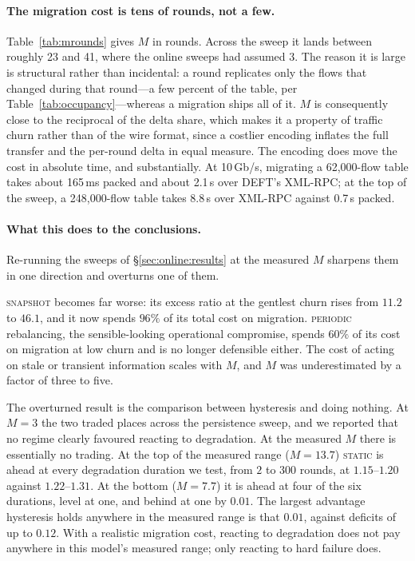 \paragraph{The migration cost is tens of rounds, not a few.}
Table~\ref{tab:mrounds} gives $M$ in rounds. Across the sweep it lands between
roughly 23 and 41, where the online sweeps had assumed $3$. The reason it is
large is structural rather than incidental: a round replicates only the flows that
changed during that round---a few percent of the table, per
Table~\ref{tab:occupancy}---whereas a migration ships all of it. $M$ is
consequently close to the reciprocal of the delta share, which makes it a
property of traffic churn rather than of the wire format, since a costlier
encoding inflates the full transfer and the per-round delta in equal measure.
The encoding does move the cost in absolute time, and substantially. At 10\,Gb/s,
migrating a 62{,}000-flow table takes about 165\,ms packed and about 2.1\,s over
DEFT's XML-RPC; at the top of the sweep, a 248{,}000-flow table takes 8.8\,s over
XML-RPC against 0.7\,s packed.

\paragraph{What this does to the conclusions.}
Re-running the sweeps of \S\ref{sec:online:results} at the measured
$M$ sharpens them in one direction and overturns one of them.

\textsc{snapshot} becomes far worse: its excess ratio at the gentlest churn rises
from $11.2$ to $46.1$, and it now spends $96\%$ of its total cost on migration.
\textsc{periodic} rebalancing, the sensible-looking operational compromise, spends
$60\%$ of its cost on migration at low churn and is no longer defensible either.
The cost of acting on stale or transient information scales with $M$, and $M$ was
underestimated by a factor of three to five.

The overturned result is the comparison between hysteresis and doing nothing. At
$M=3$ the two traded places across the persistence sweep, and we reported that no
regime clearly favoured reacting to degradation. At the measured $M$ there is
essentially no trading. At the top of the measured range ($M = 13.7$)
\textsc{static} is ahead at every degradation duration we test, from $2$ to $300$
rounds, at $1.15$--$1.20$ against $1.22$--$1.31$. At the bottom ($M = 7.7$) it is
ahead at four of the six durations, level at one, and behind at one by $0.01$.
The largest advantage hysteresis holds anywhere in the measured range is that
$0.01$, against deficits of up to $0.12$. With a realistic
migration cost, reacting to degradation does not pay anywhere in this model's
measured range; only reacting to hard failure does.

